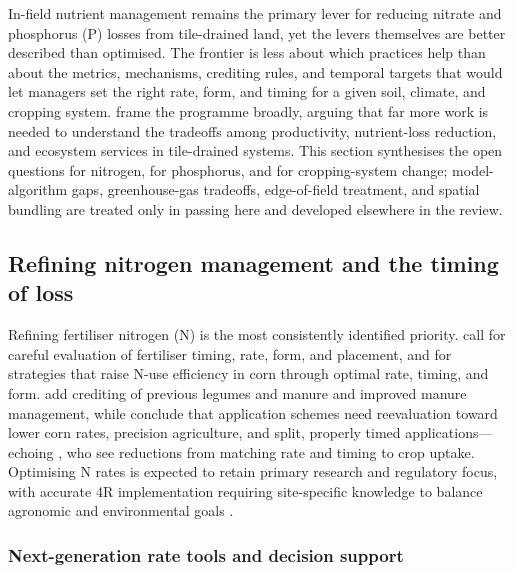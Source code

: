 In-field nutrient management remains the primary lever for reducing nitrate
and phosphorus (P) losses from tile-drained land, yet the levers themselves are
better described than optimised. The frontier is less about which practices
help than about the metrics, mechanisms, crediting rules, and temporal targets
that would let managers set the right rate, form, and timing for a given soil,
climate, and cropping system. \textcite{Ma2025} frame the programme broadly,
arguing that far more work is needed to understand the tradeoffs among
productivity, nutrient-loss reduction, and ecosystem services in tile-drained
systems. This section synthesises the open questions for nitrogen, for
phosphorus, and for cropping-system change; model-algorithm gaps,
greenhouse-gas tradeoffs, edge-of-field treatment, and spatial bundling are
treated only in passing here and developed elsewhere in the review.

\subsection{Refining nitrogen management and the timing of loss}

Refining fertiliser nitrogen (N) is the most consistently identified priority.
\textcite{ROSSI1991} call for careful evaluation of fertiliser timing, rate,
form, and placement, and \textcite{Zhao2000} for strategies that raise N-use
efficiency in corn through optimal rate, timing, and form. \textcite{Randall2001}
add crediting of previous legumes and manure and improved manure management,
while \textcite{Dattamudi2020} conclude that application schemes need
reevaluation toward lower corn rates, precision agriculture, and split, properly
timed applications---echoing \textcite{Elmi2002}, who see reductions from
matching rate and timing to crop uptake. Optimising N rates is expected to
retain primary research and regulatory focus, with accurate 4R implementation
requiring site-specific knowledge to balance agronomic and environmental goals
\parencite{Christianson2015b}.

\subsubsection{Next-generation rate tools and decision support}

